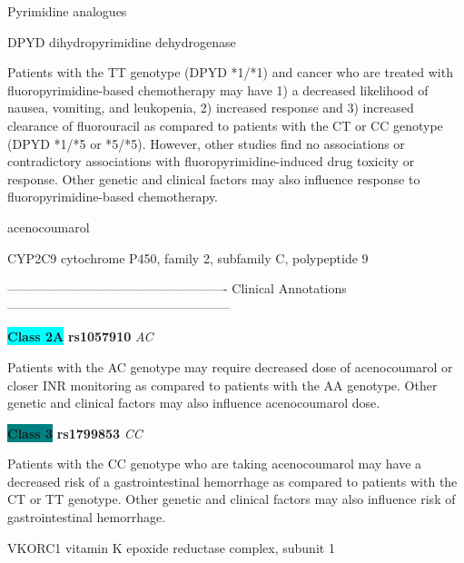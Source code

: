 \documentclass{resume} %
\begin{document}
\begin{rSection}{ Pyrimidine analogues }
\begin{rSubsection}{ DPYD }{ dihydropyrimidine dehydrogenase }{}{}
\item[] Patients with the TT genotype (DPYD *1/*1) and cancer who are treated with fluoropyrimidine-based chemotherapy may have 1) a decreased likelihood of nausea, vomiting, and leukopenia, 2) increased response and 3) increased clearance of fluorouracil as compared to patients with the CT or CC genotype (DPYD *1/*5 or *5/*5). However, other studies find no associations or contradictory associations with fluoropyrimidine-induced drug toxicity or response. Other genetic and clinical factors may also influence response to fluoropyrimidine-based chemotherapy.
\end{rSubsection}

\end{rSection}\begin{rSection}{ acenocoumarol }
\item[]

\begin{rSubsection}{ CYP2C9 }{ cytochrome P450, family 2, subfamily C, polypeptide 9 }{}{}
\item[]

\item[] ---------------------------------------------------- Clinical Annotations -----------------------------------------------------\newline
\item \textbf{\colorbox{cyan} {Class 2A}} \textbf{ rs1057910 } \textit{ AC }
\item[] Patients with the AC genotype may require decreased dose of acenocoumarol or closer INR monitoring as compared to patients with the AA genotype. Other genetic and clinical factors may also influence acenocoumarol dose.\item \textbf{\colorbox{teal} {Class 3}} \textbf{ rs1799853 } \textit{ CC }
\item[] Patients with the CC genotype who are taking acenocoumarol may have a decreased risk of a gastrointestinal hemorrhage as compared to patients with the CT or TT genotype. Other genetic and clinical factors may also influence risk of gastrointestinal hemorrhage.
\end{rSubsection}\begin{rSubsection}{ VKORC1 }{ vitamin K epoxide reductase complex, subunit 1 }{}{}
\item[]


\end{rSubsection}
\end{rSection}
\end{document}
